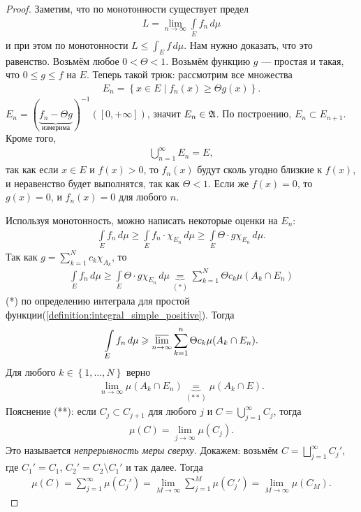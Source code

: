 \documentclass[a4paper,14pt]{extarticle}
\theoremstyle{definition}
\theoremstyle{plain}
\theoremstyle{plain}
\theoremstyle{plain}
\theoremstyle{plain}
\theoremstyle{definition}
\theoremstyle{definition}
\theoremstyle{definition}
\theoremstyle{definition}
\theoremstyle{definition}
\theoremstyle{definition}
\theoremstyle{plain}
\theoremstyle{plain}
\theoremstyle{plain}
\theoremstyle{plain}
\theoremstyle{definition}
\theoremstyle{definition}
\theoremstyle{definition}
\theoremstyle{definition}
\theoremstyle{definition}
\newcommand{\A}{\ensuremath \mathfrak{A}}
\begin{document}
\begin{proof}
 Заметим, что по монотонности существует предел 
\begin{align*}
L = \lim_{n \to \infty} \int\limits_E f_n \, d\mu
\end{align*} и при этом по монотонности $L \leqslant \int_E f\,d\mu$. Нам нужно доказать, что это равенство. Возьмём любое $0 < \Theta < 1$. Возьмём функцию $g$ --- простая и такая, что $0 \leqslant g \leqslant f$ на $E$. Теперь такой трюк: рассмотрим все множества \begin{align*}
 E_n = \left\{ x \in E \mid f_n(x) \geqslant \Theta g(x) \right\}
 .\end{align*} $E_n = (\underbrace{f_n - \Theta g}_{\text{ измерима }})^{-1}([0, +\infty])$, значит $E_n \in \A$. По построению, $E_n \subset E_{n+1}$. Кроме того, \begin{align*}
 \bigcup_{n=1}^{\infty} E_n = E
,\end{align*} так как если $x \in E$ и $f(x) > 0$, то $f_n(x)$ будут сколь угодно близкие к  $f(x)$, и неравенство будет выполнятся, так как  $\Theta < 1$. Если же  $f(x) = 0$, то  $g(x) = 0$, и $f_n(x) = 0$ для любого  $n$.

Используя монотонность, можно написать некоторые оценки на $E_n$: \begin{align*}
 \int\limits_E f_n \, d\mu \geqslant \int\limits_{E} f_n \cdot \chi_{E_n} \, d\mu \geqslant \int\limits_E \Theta \cdot g \chi_{E_n} \, d\mu
.\end{align*} Так как $g = \sum_{k=1}^{N} c_k \chi_{A_k}$, то \begin{align*}
\int\limits_E f_n \, d\mu \geqslant \int\limits_E \Theta \cdot g\chi_{E_n} \, d\mu \underbrace{=}_{(*)} \sum_{k=1}^{N} \Theta c_k \mu (A_k \cap E_n)
\end{align*}  (*) по определению интеграла для простой функции(\ref{definition:integral_simple_positive}). Тогда \begin{align*}
\int\limits_E f_n\, d\mu \geqslant \varlimsup_{n \to \infty} \sum_{k=1}^{n} \Theta c_k \mu(A_k \cap E_n)
.\end{align*} Для любого $k \in \left\{ 1, \ldots, N \right\}$ верно \begin{align*}
\lim_{n\to \infty} \mu(A_k \cap E_n) \underbrace{=}_{(**)} \mu(A_k \cap E)
.\end{align*} Пояснение (**): если $C_j \subset C_{j+1}$ для любого $j$ и  $C = \bigcup_{j=1}^{\infty} C_j$, тогда \begin{align*}
\mu(C) = \lim_{j \to \infty} \mu(C_j)
.\end{align*} Это называется \textit{непрерывность меры сверху}. Докажем: возьмём $C = \bigsqcup_{j=1}^{\infty} C_j' $, где $C_1' = C_1$,  $C_2' = C_2 \setminus C_1'$ и так далее. Тогда \begin{align*}
\mu(C) = \sum_{j=1}^{\infty} \mu( C_j' ) = \lim_{M \to \infty} \sum_{j=1}^{M}  \mu(C_j') = \lim_{M \to \infty} \mu(C_M)
.\end{align*} 


\end{proof}
\end{document}
